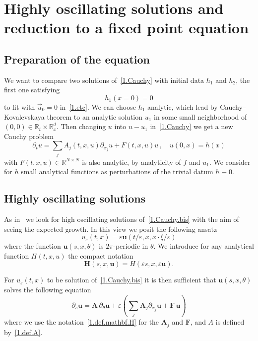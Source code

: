 \documentclass[AHL,Unicode,longabstracts,published]{cedram}
\theoremstyle{plain}
\newcommand*\e{\varepsilon}
\newcommand*\R{{\mathbb R}}
\newcommand{\dptl}{\partial}%
\newcommand{\ubf}{{\mathbf u}}
\newcommand{\Hbf}{{\mathbf H}}
\begin{document}
\section{Highly oscillating solutions and reduction to a fixed point equation}\label{1.section.ansatz}



\subsection{Preparation of the equation}



We want to compare two solutions of~\eqref{1.Cauchy} with initial data $h_1$ and $h_2$, the first one satisfying
\[
h_1(x=0) = 0
\]
to fit with $\vec{u}_0 = 0$ in~\eqref{1.etc}. We can choose $h_1$ analytic, which lead by Cauchy--Kovalevskaya theorem to an analytic solution $u_1$ in some small neighborhood of $(0,0)\in\R_{t}\times\R_{x}^{d}$. Then changing $u$ into $u-u_1$ in~\eqref{1.Cauchy} we get a new Cauchy problem
\begin{equation}\label{1.Cauchy.bis}
\dptl_{t}u = \sum_{j}A_{j}(t,x,u)\dptl_{x_j}{u} + F(t,x,u)u \,, \quad u(0,x) = h(x)
\end{equation}
with $F(t,x,u)\in\R^{N\times N}$ is also analytic, by analyticity of $f$ and $u_1$. We consider for $h$ small analytical functions as perturbations of the trivial datum $h\equiv 0$.



\subsection{Highly oscillating solutions}



As in~\cite{metivier2005remarks} we look for high oscillating solutions of~\eqref{1.Cauchy.bis} with the aim of seeing the expected growth. In this view we posit the following ansatz
\begin{equation}\label{1.ansatz}
u_{\e}(t,x) = \e \ubf(t/\e,x,x\cdot\xi/\e)
\end{equation}
where the function $\ubf(s,x,\theta)$ is $2\pi$-periodic in $\theta$. We introduce for any analytical function $H(t,x,u)$ the compact notation
\begin{equation}\label{1.def.mathbf.H}
\Hbf(s,x,\ubf) = H\left(\e s,x,\e\ubf\right).
\end{equation}


For $u_{\e}(t,x)$ to be solution of~\eqref{1.Cauchy.bis} it is then sufficient that $\ubf(s,x,\theta)$ solves the following equation
\begin{equation}\label{1.ds.u.passager}
\dptl_{s} \ubf = {\mathbf A}\,\dptl_{\theta} \ubf + \e\left(\sum_j {\mathbf A}_j \dptl_{x_j} \ubf + {\mathbf F} \, \ubf\right)
\end{equation}
where we use the notation~\eqref{1.def.mathbf.H} for the $\mathbf{A}_j$ and $\mathbf{F}$, and $A$ is defined by~\eqref{1.def.A}.
\end{document}
